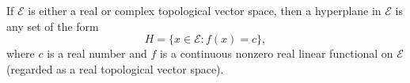 If $\mathcal{E}$ is either a real or complex topological vector space, then a hyperplane in $\mathcal{E}$ is any set of the form
$$H = \{x \in \mathcal{E} : f(x) = c\},$$
where $c$ is a real number and $f$ is a continuous nonzero real linear functional on $\mathcal{E}$ (regarded as a real topological vector space).
